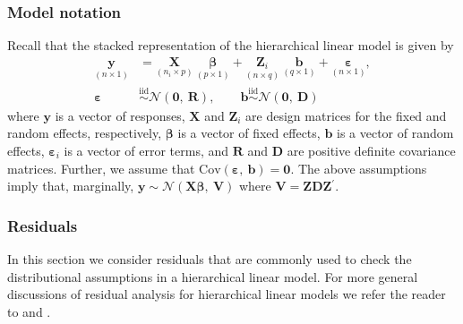 \documentclass[12pt]{article} %
\newcommand{\trans}{\ensuremath{^\prime}}
\newcommand{\cov}{\ensuremath{\mathrm{Cov}}}
\begin{document}
\subsubsection{Model notation}
Recall that the stacked representation of the hierarchical linear model is given by 
%
\begin{align}\label{eq:hlm}
	\underset{(n \times 1)}{\bm{y}} &= \underset{(n_i \times p)}{\bm{X}} \ \underset{(p \times 1)}{\bm{\beta}} + \underset{(n \times q)}{\bm{Z}_i} \ \underset{(q \times 1)}{\bm{b}} + \underset{(n \times 1)}{\bm{\varepsilon}},\\
	\bm{\varepsilon} & \overset{\text{iid}}{\sim} \mathcal{N}(\bm{0}, \ \bm{R}), \qquad \bm{b} \overset{\text{iid}}{\sim} \mathcal{N}(\bm{0},\ \bm{D}) \nonumber
\end{align}
%
where $\bm{y}$ is a vector of responses, $\bm{X}$ and $\bm{Z}_i$ are design matrices for the fixed and random effects, respectively, $\bm{\beta}$ is a vector of fixed effects, $\bm{b}$ is a vector of random effects, $\bm{\varepsilon}_i$ is a vector of error terms, and $\bm{R}$ and $\bm{D}$ are positive definite covariance matrices. Further, we assume that $\cov(\bm{\varepsilon},\ \bm{b}) = \bm{0}$. The above assumptions imply that, marginally, $\bm{y} \sim \mathcal{N}(\bm{X\beta},\ \bm{V})$ where $\bm{V} = \bm{ZDZ}\trans$.

\subsubsection{Residuals}

In this section we consider residuals that are commonly used to check the distributional assumptions in a hierarchical linear model. For more general discussions of residual analysis for hierarchical linear models we refer the reader to \cite{Haslett:2007vv} and \cite{Nobre:2007ej}.
\end{document}
